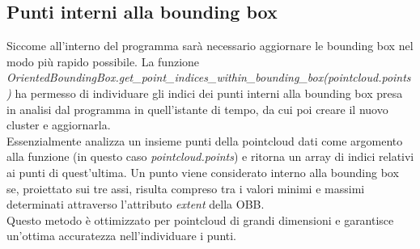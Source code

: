 \documentclass[italian]{report}
\begin{document}
\subsection{Punti interni alla bounding box}
Siccome all'interno del programma sarà necessario aggiornare le bounding box nel modo più rapido possibile. La funzione\\ \textit{OrientedBoundingBox.get\_point\_indices\_within\_bounding\_box(pointcloud.points)} ha permesso di individuare gli indici dei punti interni alla bounding box presa in analisi dal programma in quell'istante di tempo, da cui poi creare il nuovo cluster e aggiornarla.\\ 
Essenzialmente analizza un insieme punti della pointcloud dati come argomento alla funzione (in questo caso \textit{pointcloud.points}) e ritorna un array di indici relativi ai punti di quest'ultima. Un punto viene considerato interno alla bounding box se, proiettato sui tre assi, risulta compreso tra i valori minimi e massimi determinati attraverso l'attributo \textit{extent} della OBB.\\
Questo metodo è ottimizzato per pointcloud di grandi dimensioni e garantisce un'ottima accuratezza nell'individuare i punti.
\end{document}
